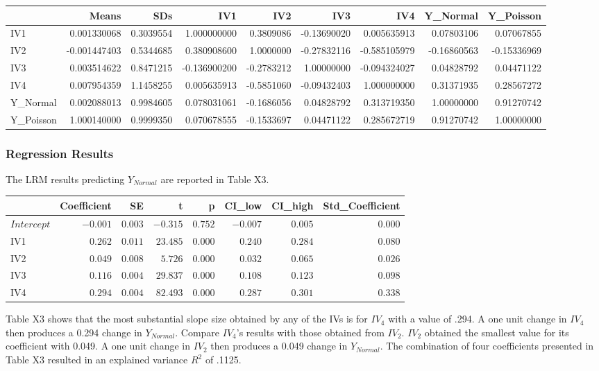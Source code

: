 \documentclass[ShortAfour,times,sageapa]{sagej}
\begin{document}
	\begin{longtable}{l|rr|rrrrrr}
		\toprule
		\multicolumn{1}{l}{} & Means & SDs & IV1 & IV2 & IV3 & IV4 & Y\_Normal & Y\_Poisson \\ 
		\midrule
		IV1 & 0.001330068 & 0.3039554 & 1.000000000 & 0.3809086 & -0.13690020 & 0.005635913 & 0.07803106 & 0.07067855 \\ 
		IV2 & -0.001447403 & 0.5344685 & 0.380908600 & 1.0000000 & -0.27832116 & -0.585105979 & -0.16860563 & -0.15336969 \\ 
		IV3 & 0.003514622 & 0.8471215 & -0.136900200 & -0.2783212 & 1.00000000 & -0.094324027 & 0.04828792 & 0.04471122 \\ 
		IV4 & 0.007954359 & 1.1458255 & 0.005635913 & -0.5851060 & -0.09432403 & 1.000000000 & 0.31371935 & 0.28567272 \\ 
		Y\_Normal & 0.002088013 & 0.9984605 & 0.078031061 & -0.1686056 & 0.04828792 & 0.313719350 & 1.00000000 & 0.91270742 \\ 
		Y\_Poisson & 1.000140000 & 0.9999350 & 0.070678555 & -0.1533697 & 0.04471122 & 0.285672719 & 0.91270742 & 1.00000000 \\ 
		\bottomrule
	\end{longtable}

		\subsubsection{Regression Results}
		
	The LRM results predicting $Y_{Normal}$ are reported in Table X3.
	
	\begin{longtable}{l|rrrrrrr}
		\toprule
		\multicolumn{1}{l}{} & Coefficient & SE & t & p & CI\_low & CI\_high & Std\_Coefficient \\ 
		\midrule
		\(Intercept\) & $-0.001$ & $0.003$ & $-0.315$ & $0.752$ & $-0.007$ & $0.005$ & $0.000$ \\ 
		IV1 & $0.262$ & $0.011$ & $23.485$ & $0.000$ & $0.240$ & $0.284$ & $0.080$ \\ 
		IV2 & $0.049$ & $0.008$ & $5.726$ & $0.000$ & $0.032$ & $0.065$ & $0.026$ \\ 
		IV3 & $0.116$ & $0.004$ & $29.837$ & $0.000$ & $0.108$ & $0.123$ & $0.098$ \\ 
		IV4 & $0.294$ & $0.004$ & $82.493$ & $0.000$ & $0.287$ & $0.301$ & $0.338$ \\ 
		\bottomrule
	\end{longtable}
	
	Table X3 shows that the most substantial slope size obtained by any of the IVs is for $IV_4$ with a value of .294.  
	A one unit change in $IV_4$ then produces a 0.294 change in $Y_{Normal}$.
	Compare $IV_4$'s results with those obtained from $IV_2$.
	$IV_2$ obtained the smallest value for its coefficient with 0.049.
	A one unit change in $IV_2$ then produces a 0.049 change in $Y_{Normal}$.	
	The combination of four coefficients presented in Table X3 resulted in an explained variance $R^2$ of .1125.
	
\end{document}
